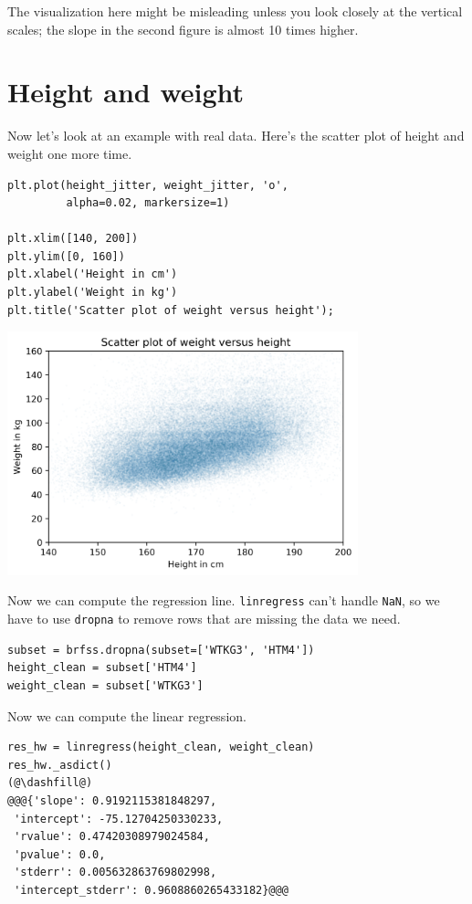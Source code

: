 The visualization here might be misleading unless you look closely at
the vertical scales; the slope in the second figure is almost 10 times
higher.

\hypertarget{height-and-weight}{%
\section{Height and weight}\label{height-and-weight}}

Now let's look at an example with real data. Here's the scatter plot of
height and weight one more time.

\begin{lstlisting}[]
plt.plot(height_jitter, weight_jitter, 'o', 
         alpha=0.02, markersize=1)

plt.xlim([140, 200])
plt.ylim([0, 160])
plt.xlabel('Height in cm')
plt.ylabel('Weight in kg')
plt.title('Scatter plot of weight versus height');
\end{lstlisting}

\begin{center}
\includegraphics[width=4in]{chapters/09_relationships_files/09_relationships_93_0.png}
\end{center}

Now we can compute the regression line.
\passthrough{\lstinline!linregress!} can't handle
\passthrough{\lstinline!NaN!}, so we have to use
\passthrough{\lstinline!dropna!} to remove rows that are missing the
data we need.

\begin{lstlisting}[]
subset = brfss.dropna(subset=['WTKG3', 'HTM4'])
height_clean = subset['HTM4']
weight_clean = subset['WTKG3']
\end{lstlisting}

Now we can compute the linear regression.

\begin{lstlisting}[]
res_hw = linregress(height_clean, weight_clean)
res_hw._asdict()
(@\dashfill@)
@@@{'slope': 0.9192115381848297,
 'intercept': -75.12704250330233,
 'rvalue': 0.47420308979024584,
 'pvalue': 0.0,
 'stderr': 0.005632863769802998,
 'intercept_stderr': 0.9608860265433182}@@@
\end{lstlisting}

